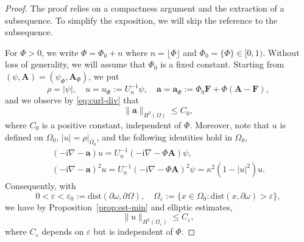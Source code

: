 \documentclass[11pt]{amsart}
\newcommand{\Ab}{\mathbf A}
\newcommand{\Fb}{\mathbf F}
\newcommand{\ab}{\mathbf a}
\newcommand{\ii}{\mathrm i}
\theoremstyle{definition}
\numberwithin{equation}{section}
\begin{document}
\begin{proof}
The proof relies on a compactness argument and the extraction of a subsequence. To simplify the exposition, we will skip the reference to the subsequence.

For $\Phi>0$, we write $\Phi=\Phi_0+n$ where $n=\lfloor \Phi\rfloor$ and $\Phi_0=\{\Phi\}\in [0,1)$. Without loss of generality, we will assume that $\Phi_0$ is a fixed constant. Starting from $(\psi,\Ab)=(\psi_\Phi,\Ab_\Phi)$, we put
\[ \rho=|\psi|,\quad u=u_\Phi:=U_n^{-1}\psi,\quad \ab=\ab_\Phi:=\Phi_0\Fb+\Phi(\Ab-\Fb), \]
and we observe by \eqref{eq:curl-div} that
\[ \|\ab\|_{H^2(\Omega)}\leq C_0,\]
where $C_0$ is a positive constant, independent of $\Phi$.  Moreover, note that $u$ is defined on $\Omega_0$,  $|u|=\rho|_{\Omega_0}$, and the  following identities hold in $\Omega_0$,
\[\begin{gathered}
(-\ii\nabla-\ab)u=U_n^{-1}(-\ii\nabla-\Phi\Ab)\psi,\\
(-\ii\nabla-\ab)^2u=U_n^{-1}(-\ii\nabla-\Phi\Ab)^2\psi=\kappa^2(1-|u|^2)u.
\end{gathered}\]
Consequently, with
\begin{equation}\label{eq:def-Om-ep}
0<\varepsilon<\varepsilon_0:=\mathrm{dist}(\partial\omega,\partial\Omega),\quad \Omega_\varepsilon:=\{x\in\Omega_0\colon \mathrm{dist}(x,\partial\omega)>\varepsilon\},
\end{equation} we have  by Proposition~\ref{prop:est-min} and elliptic estimates,
\[\|u\|_{H^2(\Omega_\varepsilon)}\leq C_\varepsilon, \]
where $C_\varepsilon$ depends on $\varepsilon$ but is independent of $\Phi$.



\end{proof}
\end{document}
